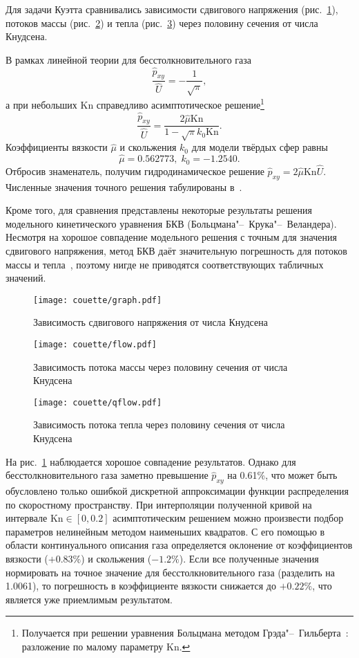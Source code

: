 \documentclass[a4paper,12pt]{article}
\newcommand{\Kn}{\mathrm{Kn}}
\begin{document}
Для задачи Куэтта сравнивались зависимости сдвигового напряжения (рис.~\ref{fig:couette:shear}),
потоков массы (рис.~\ref{fig:couette:flow}) и тепла (рис.~\ref{fig:couette:qflow})
через половину сечения от числа Кнудсена.

В рамках линейной теории для бесстолкновительного газа
\[ \frac{\hat{p}_{xy}}{\hat{U}} = -\frac1{\sqrt{\pi}}, \]
а при небольших \(\Kn\) справедливо асимптотическое решение\footnote
{ Получается при решении уравнения Больцмана методом Грэда"--~Гильберта~\cite{Sone2007}: разложение по малому параметру \(\Kn\). }
\[ \frac{\hat{p}_{xy}}{\hat{U}} = \frac{2\hat{\mu}\Kn}{1-\sqrt{\pi}k_0\Kn}. \]
Коэффициенты вязкости \(\hat{\mu}\) и скольжения \(k_0\) для модели твёрдых сфер равны~\cite{Sone2007}
\[ \hat{\mu} = 0.562773, \; k_0 = -1.2540. \]
Отбросив знаменатель, получим гидродинамическое решение \(\hat{p}_{xy} = 2\hat{\mu}\Kn\hat{U}\).
Численные значения точного решения табулированы в~\cite{Sone1990}.

Кроме того, для сравнения представлены некоторые результаты
решения модельного кинетического уравнения БКВ (Больцмана"--~Крука"--~Веландера).
Несмотря на хорошое совпадение модельного решения с точным для значения сдвигового напряжения,
метод БКВ даёт значительную погрешность для потоков массы и тепла~\cite{Sone1990},
поэтому нигде не приводятся соответствующих табличных значений.

\begin{figure}
    \centering
    \texttt{[image: couette/graph.pdf]}
    \caption{Зависимость сдвигового напряжения от числа Кнудсена}\label{fig:couette:shear}
\end{figure}

\begin{figure}
    \centering
    \texttt{[image: couette/flow.pdf]}
    \caption{Зависимость потока массы через половину сечения от числа Кнудсена}\label{fig:couette:flow}
\end{figure}

\begin{figure}
    \centering
    \texttt{[image: couette/qflow.pdf]}
    \caption{Зависимость потока тепла через половину сечения от числа Кнудсена}\label{fig:couette:qflow}
\end{figure}

На рис.~\ref{fig:couette:shear} наблюдается хорошое совпадение результатов.
Однако для бесстолкновительного газа заметно превышение \(\hat{p}_{xy}\) на 0.61\%,
что может быть обусловлено только ошибкой дискретной аппроксимации функции распределения по скоростному пространству.
При интерполяции полученной кривой на интервале \(\Kn\in[0,0.2]\) асимптотическим решением
можно произвести подбор параметров нелинейным методом наименьших квадратов.
С его помощью в области континуального описания газа определяется оклонение
от коэффициентов вязкости (\(+0.83\%\)) и скольжения (\(-1.2\%\)).
Если все полученные значения нормировать на точное значение для бесстолкновительного газа (разделить на 1.0061),
то погрешность в коэффициенте вязкости снижается до \(+0.22\%\), что является уже приемлимым результатом.
\end{document}
